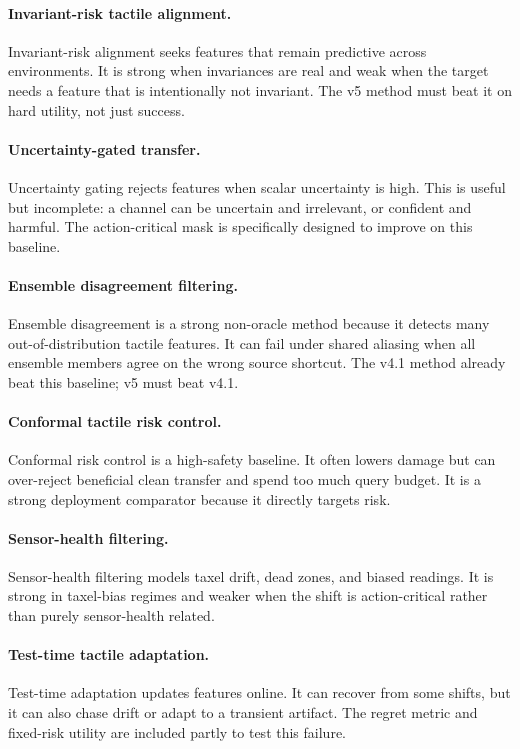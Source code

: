 \documentclass{article}
\begin{document}
\paragraph{Invariant-risk tactile alignment.}
Invariant-risk alignment seeks features that remain predictive across environments. It is strong when invariances are real and weak when the target needs a feature that is intentionally not invariant. The v5 method must beat it on hard utility, not just success.

\paragraph{Uncertainty-gated transfer.}
Uncertainty gating rejects features when scalar uncertainty is high. This is useful but incomplete: a channel can be uncertain and irrelevant, or confident and harmful. The action-critical mask is specifically designed to improve on this baseline.

\paragraph{Ensemble disagreement filtering.}
Ensemble disagreement is a strong non-oracle method because it detects many out-of-distribution tactile features. It can fail under shared aliasing when all ensemble members agree on the wrong source shortcut. The v4.1 method already beat this baseline; v5 must beat v4.1.

\paragraph{Conformal tactile risk control.}
Conformal risk control is a high-safety baseline. It often lowers damage but can over-reject beneficial clean transfer and spend too much query budget. It is a strong deployment comparator because it directly targets risk.

\paragraph{Sensor-health filtering.}
Sensor-health filtering models taxel drift, dead zones, and biased readings. It is strong in taxel-bias regimes and weaker when the shift is action-critical rather than purely sensor-health related.

\paragraph{Test-time tactile adaptation.}
Test-time adaptation updates features online. It can recover from some shifts, but it can also chase drift or adapt to a transient artifact. The regret metric and fixed-risk utility are included partly to test this failure.
\end{document}
